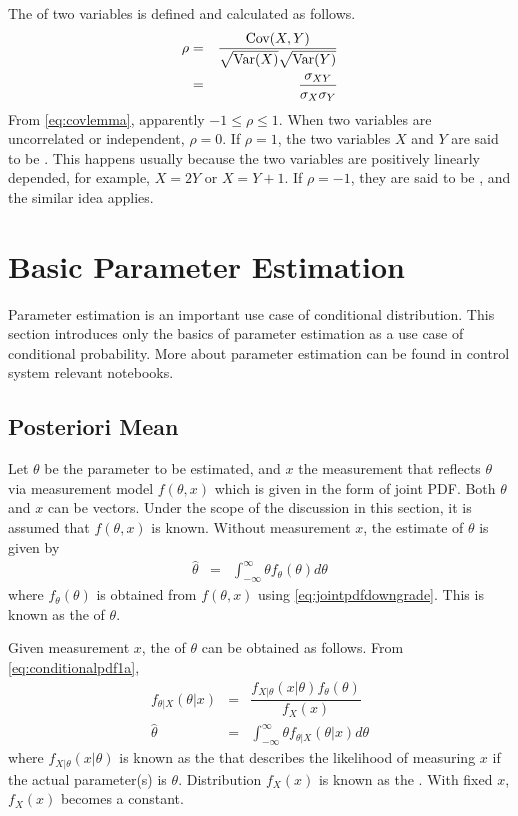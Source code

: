 The  of two variables is defined and calculated as follows.
\begin{eqnarray}
	\rho &=& \dfrac{\textup{Cov}(X, Y)}{\sqrt{\textup{Var}(X)}\sqrt{\textup{Var}(Y)}} \nonumber \\
	&=& \dfrac{\sigma_{XY}}{\sigma_X\sigma_Y} \nonumber
\end{eqnarray}
From \eqref{eq:covlemma}, apparently $-1\leq \rho \leq 1$. When two variables are uncorrelated or independent, $\rho=0$. If $\rho=1$, the two variables $X$ and $Y$ are said to be . This happens usually because the two variables are positively linearly depended, for example, $X=2Y$ or $X=Y+1$. If $\rho=-1$, they are said to be , and the similar idea applies.

\section{Basic Parameter Estimation}

Parameter estimation is an important use case of conditional distribution. This section introduces only the basics of parameter estimation as a use case of conditional probability. More about parameter estimation can be found in control system relevant notebooks. 

\subsection{Posteriori Mean}

Let $\theta$ be the parameter to be estimated, and $x$ the measurement that reflects $\theta$ via measurement model $f(\theta, x)$ which is given in the form of joint PDF. Both $\theta$ and $x$ can be vectors. Under the scope of the discussion in this section, it is assumed that $f(\theta,x)$ is known. Without measurement $x$, the estimate of $\theta$ is given by
\begin{eqnarray}
	\hat{\theta} &=& \int_{-\infty}^{\infty} \theta f_\theta(\theta) d\theta \nonumber
\end{eqnarray}
where $f_\theta(\theta)$ is obtained from $f(\theta,x)$ using \eqref{eq:jointpdfdowngrade}. This is known as the  of $\theta$. 

Given measurement $x$, the  of $\theta$ can be obtained as follows. From \eqref{eq:conditionalpdf1a},
\begin{eqnarray}
	f_{\theta|X}(\theta|x) &=& \dfrac{f_{X|\theta}(x|\theta)f_\theta(\theta)}{f_X(x)} \label{eq:conditionalpdf2} \\
	\hat{\theta} &=& \int_{-\infty}^{\infty} \theta f_{\theta|X}(\theta|x) d\theta \label{eq:posterioriestimation}
\end{eqnarray}
where $f_{X|\theta}(x|\theta)$ is known as the  that describes the likelihood of measuring $x$ if the actual parameter(s) is $\theta$. Distribution $f_X(x)$ is known as the . With fixed $x$, $f_X(x)$ becomes a constant.

